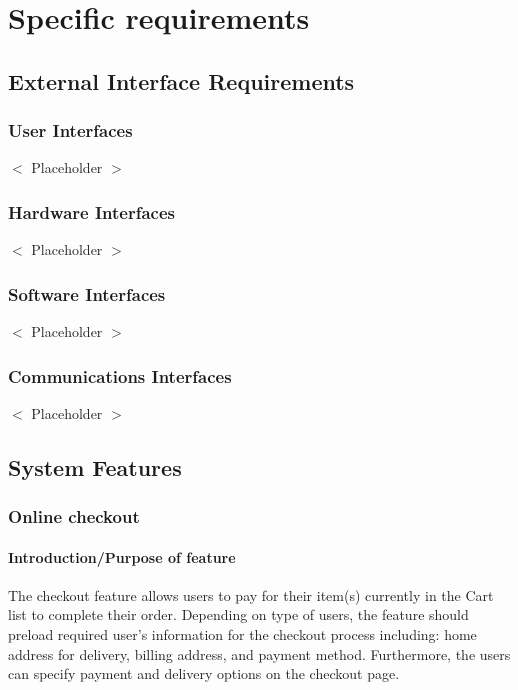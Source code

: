 \documentclass{scrreprt}
\begin{document}
{\let\clearpage\relax 
\chapter{Specific requirements}}

\section{External Interface Requirements}

\subsection{User Interfaces}
$<$ Placeholder $>$

\subsection{Hardware Interfaces}
$<$ Placeholder $>$

\subsection{Software Interfaces}
$<$ Placeholder $>$

\subsection{Communications Interfaces}
$<$ Placeholder $>$

\section{System Features}



\subsection{Online checkout}
\subsubsection{Introduction/Purpose of feature}
The checkout feature allows users to pay for their item(s) currently in the Cart list to complete their order. Depending on type of users, the feature should preload required user’s information for the checkout process including: home address for delivery, billing address, and payment method. Furthermore, the users can specify payment and delivery options on the checkout page. 
\end{document}
